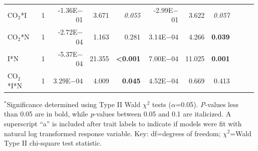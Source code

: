 \begin{landscape}
\begin{table}
{\begin{tabular}{p{3cm}p{0.5cm}p{1.75cm}p{1.5cm}p{1.5cm}p{1.75cm}p{1.5cm}p{1.5cm}p{1.75cm}p{1.5cm}p{1.5cm}}
            CO$_2$*I & \multicolumn{1}{r}{1}
            & \multicolumn{1}{r}{-1.36E$-$01}     & \multicolumn{1}{r}{3.671}         & \multicolumn{1}{r}{\textit{0.055}}
            & \multicolumn{1}{r}{-2.99E$-$01}     & \multicolumn{1}{r}{3.622}         & \multicolumn{1}{r}{\textit{0.057}}
            & \multicolumn{1}{r}{}              & \multicolumn{1}{r}{}              & \multicolumn{1}{r}{} 
            \\

            CO$_2$*N & \multicolumn{1}{r}{1}
            & \multicolumn{1}{r}{-2.72E$-$04}     & \multicolumn{1}{r}{1.163}         & \multicolumn{1}{r}{0.281}
            & \multicolumn{1}{r}{3.14E$-$04}      & \multicolumn{1}{r}{4.266}         & \multicolumn{1}{r}{\textbf{0.039}}
            & \multicolumn{1}{r}{}              & \multicolumn{1}{r}{}              & \multicolumn{1}{r}{} 
            \\

            I*N & \multicolumn{1}{r}{1}
            & \multicolumn{1}{r}{-5.37E$-$04}     & \multicolumn{1}{r}{21.355}        & \multicolumn{1}{r}{\textbf{<0.001}}
            & \multicolumn{1}{r}{7.00E$-$04}      & \multicolumn{1}{r}{11.025}        & \multicolumn{1}{r}{\textbf{0.001}}
            & \multicolumn{1}{r}{}              & \multicolumn{1}{r}{}              & \multicolumn{1}{r}{} 
            \\

            CO$_2$*I*N & \multicolumn{1}{r}{1}
            & \multicolumn{1}{r}{3.29E$-$04}      & \multicolumn{1}{r}{4.009}         & \multicolumn{1}{r}{\textbf{0.045}}
            & \multicolumn{1}{r}{4.52E$-$04}      & \multicolumn{1}{r}{0.669}         & \multicolumn{1}{r}{0.413}
            & \multicolumn{1}{r}{}              & \multicolumn{1}{r}{}              & \multicolumn{1}{r}{} 
            \\
            \hline
    \end{tabular}}
    \label{tab:table5.3}
    \end{table}
\begin{singlespace}
    \noindent $^*$Significance determined using Type II Wald $\chi^2$ tests ($\alpha$=0.05). \textit{P}-values less than 0.05 are in bold, while \textit{p}-values between 0.05 and 0.1 are italicized. A superscript “a” is included after trait labels to indicate if models were fit with natural log transformed response variable. Key: df=degrees of freedom; $\chi^2$=Wald Type II chi-square test statistic.
\end{singlespace}
\end{landscape}
\clearpage

